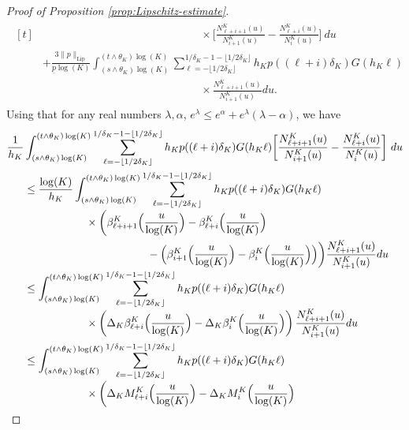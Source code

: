 \documentclass[JEP,XML,SOM,Unicode,published]{cedram}
\theoremstyle{plain}
\theoremstyle{remark}
\begin{document}
\begin{proof}[Proof of Proposition \ref{prop:Lipschitz-estimate}]
{\begin{multline*}
\begin{aligned}[t]
& \hspace{6cm}\times \biggl[\frac{N_{\ell+i+1}^K(u)}{N_{i+1}^K(u)}-\frac{N_{\ell+i}^K(u)}{N_{i}^K(u)}
\biggr]\ du \\
& +\frac{{3}\|p\|_{\text{Lip}}}{\underline{p}\log(K)}\int_{(s\wedge\theta_K)\log(K)}^{(t\wedge\theta_K)\log(K)} \sum_{\ell=-\lfloor 1/2\delta_K\rfloor}^{1/\delta_K-1-\lfloor 1/2\delta_K\rfloor} h_Kp((\ell+i)\delta_K)G(h_K\ell)\\
& \hspace{6cm} \times \frac{N_{\ell+i+1}^K(u)}{N_{i+1}^K(u)}du.
\end{aligned}
\end{multline*}
Using that for any real numbers $\lambda,\alpha$, $e^\lambda\le e^\alpha+ e^\lambda(\lambda-\alpha)$, we have
\begin{align*}
\frac{1}{h_K}&\int_{(s\wedge\theta_K)\log(K)}^{(t\wedge\theta_K)\log(K)} \sum_{\ell=-\lfloor 1/2\delta_K\rfloor}^{1/\delta_K-1-\lfloor 1/2\delta_K\rfloor} h_Kp((\ell+i)\delta_K)G(h_K\ell)\biggl[\frac{N_{\ell+i+1}^K(u)}{N_{i+1}^K(u)}-\frac{N_{\ell+i}^K(u)}{N_{i}^K(u)}
\biggr]\ du
\\
& \leq \frac{\log(K)}{ h_K}\int_{(s\wedge\theta_K)\log(K)}^{(t\wedge\theta_K)\log(K)} \sum_{\ell=-\lfloor 1/2\delta_K\rfloor}^{1/\delta_K-1-\lfloor 1/2\delta_K\rfloor} h_Kp((\ell+i)\delta_K)G(h_K\ell) \\[-3pt]
& \hspace{2cm}\times \biggl(\beta^K_{\ell+i+1}\Bigl(\frac{u}{\log(K)}\Bigr)-\beta^K_{\ell+i}\Bigl(\frac{u}{\log(K)}\Bigr)\\
& \hspace{4cm} -\Bigl(\beta^K_{i+1}\Bigl(\frac{u}{\log(K)}\Bigr)-\beta^K_i\Bigl(\frac{u}{\log(K)}\Bigr)\Bigl)\biggr) \frac{N^K_{\ell+i+1}(u)}{N^K_{i+1}(u)}du \\[-3pt]
& \leq \int_{(s\wedge\theta_K)\log(K)}^{(t\wedge\theta_K)\log(K)} \sum_{\ell=-\lfloor 1/2\delta_K\rfloor}^{1/\delta_K-1-\lfloor 1/2\delta_K\rfloor} h_Kp((\ell+i)\delta_K)G(h_K\ell)\\[-3pt]
& \hspace*{2cm}\times\left(\Delta_K\beta^K_{\ell+i}\Bigl(\frac{u}{\log(K)}\Bigr)-\Delta_K\beta^K_{i}\Bigl(\frac{u}{\log(K)}\Bigr)\right)
\frac{N^K_{\ell+i+1}(u)}{N^K_{i+1}(u)}du \\
&\leq \int_{(s\wedge\theta_K)\log(K)}^{(t\wedge\theta_K)\log(K)} \sum_{\ell=-\lfloor 1/2\delta_K\rfloor}^{1/\delta_K-1-\lfloor 1/2\delta_K\rfloor} h_Kp((\ell+i)\delta_K)G(h_K\ell)\\[-3pt]
& \hspace{2cm} \times\biggl(\Delta_KM^K_{\ell+i}\Bigl(\frac{u}{\log(K)}\Bigr)-\Delta_KM^K_{i}\Bigl(\frac{u}{\log(K)}\Bigr) \\[-3pt]

\end{align*}}
\end{proof}
\end{document}
